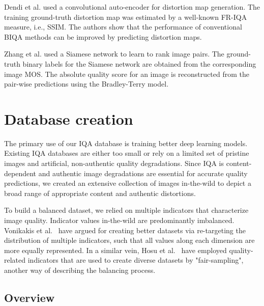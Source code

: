 \documentclass[10pt,journal,compsoc]{IEEEtran}
\begin{document}
Dendi et al. \cite{dendi2018generating} used a convolutional auto-encoder for distortion map generation. The training ground-truth distortion map was estimated by a well-known FR-IQA measure, i.e., SSIM. The authors show that the performance of conventional BIQA methods can be improved by predicting distortion maps.

Zhang et al. \cite{zhang2019learning} used a Siamese network to learn to rank image pairs. The ground-truth binary labels for the Siamese network are obtained from the corresponding image MOS. The absolute quality score for an image is reconstructed from the pair-wise predictions using the Bradley-Terry model.












 




\section{Database creation}
\label{sec:databcreate}

The primary use of our IQA database is training better deep learning models. Existing IQA databases are either too small or rely on a limited set of pristine images and artificial, non-authentic quality degradations. Since IQA is content-dependent and authentic image degradations are essential for accurate quality predictions, we created an extensive collection of images in-the-wild to depict a broad range of appropriate content and authentic distortions.

To build a balanced dataset, we relied on multiple indicators that characterize image quality. Indicator values in-the-wild are predominantly imbalanced. Vonikakis et al.~\cite{vonikakis2016shaping} have argued for creating better datasets via re-targeting the distribution of multiple indicators, such that all values along each dimension are more equally represented. In a similar vein, Hosu et al.~\cite{hosu:2017konstanz} have employed quality-related indicators that are used to create diverse datasets by "fair-sampling", another way of describing the balancing process.

\subsection{Overview}
\end{document}
